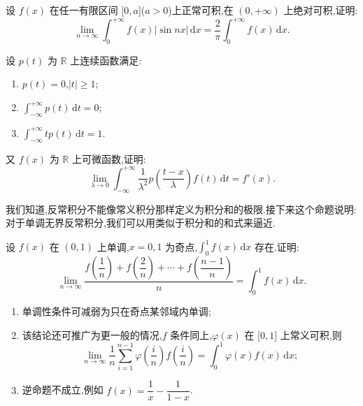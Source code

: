 \documentclass[../数学分析培优讲义.tex]{subfiles}
\begin{document}
\begin{example}
设 $f(x)$ 在任一有限区间 $\lbrack 0,a\rbrack$($a>0$)上正常可积,在 $(0,+\infty)$ 上绝对可积,证明:
\[
    \lim\limits_{n\to\infty}\int_0^{+\infty}f(x)|\sin nx|\,\mathrm{d}x
    =\dfrac{2}{\pi}\int_0^{+\infty}f(x)\,\mathrm{d}x.
\]
\end{example}
\exampleblank

\begin{example}
设 $p(t)$ 为 $\mathbb{R}$ 上连续函数满足:
\begin{enumerate}[label=(\arabic*)]
    \item $p(t)=0$,$|t|\geq1$;
    \item $\displaystyle\int_{-\infty}^{+\infty}p(t)\,\mathrm{d}t=0$;
    \item $\displaystyle\int_{-\infty}^{+\infty}tp(t)\,\mathrm{d}t=1$.
\end{enumerate}
又 $f(x)$ 为 $\mathbb{R}$ 上可微函数,证明:
\[
    \lim\limits_{\lambda\to0}\int_{-\infty}^{+\infty}
    \dfrac{1}{\lambda^2}p\left(\dfrac{t-x}{\lambda}\right)f(t)\,\mathrm{d}t
    =f'(x).
\]
\end{example}
\exampleblank

我们知道,反常积分不能像常义积分那样定义为积分和的极限.接下来这个命题说明:对于单调无界反常积分,我们可以用类似于积分和的和式来逼近.

\begin{proposition}[\markstar]
设 $f(x)$ 在 $(0,1)$ 上单调,$x=0,1$ 为奇点,$\displaystyle\int_0^1f(x)\,\mathrm{d}x$ 存在.证明:
\[
    \lim\limits_{n\to\infty}
    \dfrac{f\left(\dfrac{1}{n}\right)+f\left(\dfrac{2}{n}\right)+\cdots+f\left(\dfrac{n-1}{n}\right)}{n}
    =\int_0^1f(x)\,\mathrm{d}x.
\]
\end{proposition}

\begin{remark}
\begin{enumerate}[label=\textcircled{\arabic*}]
    \item 单调性条件可减弱为只在奇点某邻域内单调;
    \item 该结论还可推广为更一般的情况,$f$ 条件同上,$\varphi(x)$ 在 $\lbrack 0,1\rbrack$ 上常义可积,则
    \[
        \lim\limits_{n\to\infty}\dfrac{1}{n}\sum\limits_{i=1}^{n-1}
        \varphi\left(\dfrac{i}{n}\right)f\left(\dfrac{i}{n}\right)
        =\int_0^1\varphi(x)f(x)\,\mathrm{d}x;
    \]
    \item 逆命题不成立,例如 $f(x)=\dfrac{1}{x}-\dfrac{1}{1-x}$.
\end{enumerate}
\end{remark}
\end{document}
